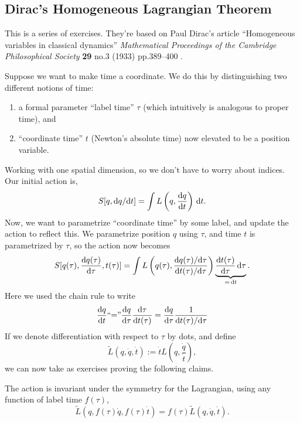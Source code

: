 \subsection{Dirac's Homogeneous Lagrangian Theorem}

\M This is a series of exercises. They're based on
Paul Dirac's article ``Homogeneous variables in classical dynamics''
\textit{Mathematical Proceedings of the Cambridge Philosophical Society}
\textbf{29} no.3 (1933) pp.389--400 {\tt{}}.

Suppose we want to make time a coordinate. We do this by distinguishing
two different notions of time:
\begin{enumerate}
\item a formal parameter ``label time'' $\tau$
  (which intuitively is analogous to proper time), and
\item ``coordinate time'' $t$ (Newton's absolute time) now elevated to
  be a position variable.
\end{enumerate}
Working with one spatial dimension, so we don't have to worry about
indices. Our initial action is,
\begin{equation}
S[q, \mathrm{d} q/\mathrm{d} t] = \int L\left(q,\frac{\mathrm{d} q}{\mathrm{d} t}\right)\,\mathrm{d} t.
\end{equation}
Now, we want to parametrize ``coordinate time'' by some label, and
update the action to reflect this.
We parametrize position $q$ using $\tau$, and time $t$ is parametrized
by $\tau$, so the action now becomes
\begin{equation}
S[q(\tau), \frac{\mathrm{d} q(\tau)}{\mathrm{d} \tau}, t(\tau)] = \int L\left(q(\tau), \frac{\mathrm{d} q(\tau)/\mathrm{d} \tau}{\mathrm{d} t(\tau)/\mathrm{d} \tau}\right) \underbrace{\frac{\mathrm{d} t(\tau)}{\mathrm{d} \tau}\,\mathrm{d} \tau}_{=\,\mathrm{d} t}.
\end{equation}
Here we used the chain rule to write
\begin{equation}
\frac{\mathrm{d} q}{\mathrm{d} t} \mbox{``=''} 
\frac{\mathrm{d} q}{\mathrm{d} \tau}
\frac{\mathrm{d} \tau}{\mathrm{d} t(\tau)}
=\frac{\mathrm{d} q}{\mathrm{d} \tau}
\frac{1}{\mathrm{d} t(\tau)/\mathrm{d} \tau}
\end{equation}
If we denote differentiation with respect to $\tau$ by dots, and define
\begin{equation}
\widetilde{L}(q,\dot{q},\dot{t}) := \dot{t} L\left(q, \frac{\dot{q}}{\dot{t}}\right),
\end{equation}
we can now take as exercises proving the following claims.

\begin{exercise}
The action is invariant under the symmetry for the Lagrangian, using any
function of label time $f(\tau)$,
\begin{equation}\label{eq:hamiltonian:dirac-xca:homogeneous-condition}
\widetilde{L}(q,f(\tau)\dot{q},f(\tau)\dot{t})
=f(\tau)\widetilde{L}(q,\dot{q},\dot{t}).
\end{equation}
\end{exercise}

